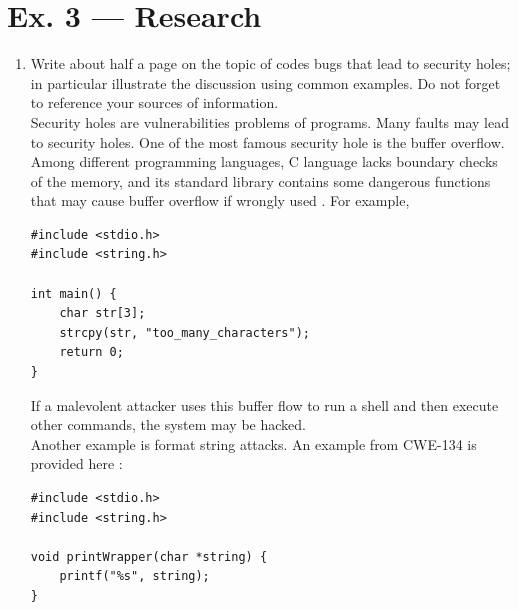 \documentclass[a4paper]{article}
\begin{document}
\section*{Ex. 3 — Research}
\begin{enumerate}
    \item Write about half a page on the topic of codes bugs that lead to security holes; in particular illustrate the discussion using common examples. Do not forget to reference your sources of information.\\
    Security holes are vulnerabilities problems of programs. Many faults may lead to security holes. One of the most famous security hole is the buffer overflow. Among different programming languages, C language lacks boundary checks of the memory, and its standard library contains some dangerous functions that may cause buffer overflow if wrongly used \cite{enwiki:1055115654}. For example,
    \begin{verbatim}
#include <stdio.h>
#include <string.h>

int main() {
    char str[3];
    strcpy(str, "too_many_characters");
    return 0;
}
    \end{verbatim}
    If a malevolent attacker uses this buffer flow to run a shell and then execute other commands, the system may be hacked.\\
    Another example is format string attacks. An example from CWE-134 is provided here \cite{fmtstr}:
    \begin{verbatim}
#include <stdio.h>
#include <string.h>

void printWrapper(char *string) {
    printf("%s", string);
}


\end{verbatim}
\end{enumerate}
\end{document}
